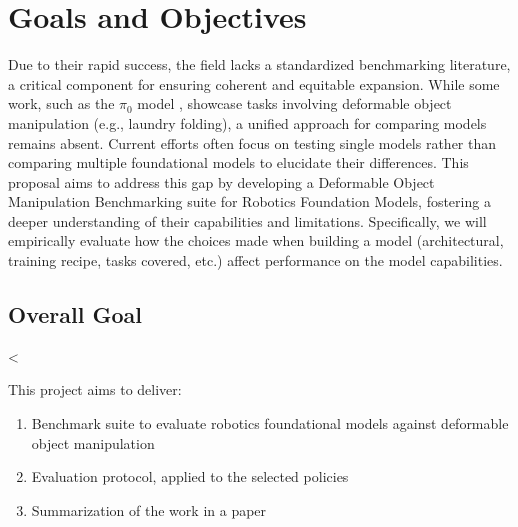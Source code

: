 \section{Goals and Objectives}
Due to their rapid success, the field lacks a standardized benchmarking literature, a critical component for ensuring coherent and equitable expansion. While some work, such as the $\pi_0$ model \cite{pi_zero}, showcase tasks involving deformable object manipulation (e.g., laundry folding), a unified approach for comparing models remains absent. Current efforts often focus on testing single models rather than comparing multiple foundational models to elucidate their differences. This proposal aims to address this gap by developing a Deformable Object Manipulation Benchmarking suite for Robotics Foundation Models, fostering a deeper understanding of their capabilities and limitations. Specifically, we will empirically evaluate how the choices made when building a model (architectural, training recipe, tasks covered, etc.) affect performance on the model capabilities.


\subsection{Overall Goal}<

This project aims to deliver:

    \begin{enumerate}
        \item Benchmark suite to evaluate robotics foundational models against deformable object manipulation
        \item Evaluation protocol, applied to the selected policies 
        \item Summarization of the work in a paper
    \end{enumerate}


